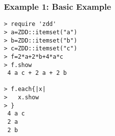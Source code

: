 \subsubsection*{Example 1: Basic Example}



\begin{Verbatim}[baselinestretch=0.7,frame=single]
> require 'zdd'
> a=ZDD::itemset("a")
> b=ZDD::itemset("b")
> c=ZDD::itemset("c")
> f=2*a+2*b+4*a*c
> f.show
 4 a c + 2 a + 2 b

> f.each{|x|
>   x.show
> }
 4 a c
 2 a
 2 b
\end{Verbatim}
